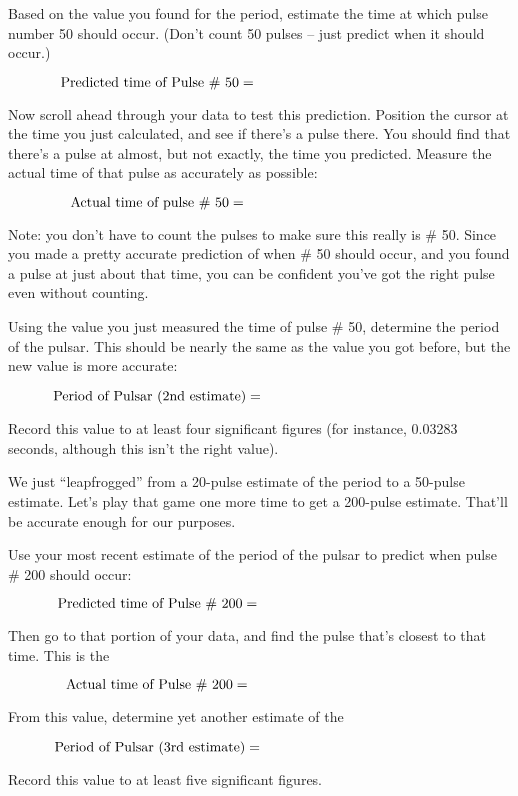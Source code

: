 Based on the value you found for the period, estimate the time at 
which pulse number 50 should occur.  (Don't count 50 pulses -- just
predict when it should occur.)

\medskip
$$
\mbox{Predicted time of Pulse \# 50}=\hbox to 2in{}
$$
\medskip

Now scroll ahead through your data to test this prediction.  Position
the cursor at the time you just calculated, and see if there's a pulse 
there.  You should find that there's a pulse at almost, but not exactly,
the time you predicted.  Measure the actual time of that pulse
as accurately as possible:

\medskip
$$
\mbox{Actual time of pulse \# 50}=\hbox to 2in{}
$$
\medskip

Note: you don't have to count the pulses to make sure this really is
\# 50.  Since you made a pretty accurate prediction of when \# 50
should occur, and you found a pulse at just about that time, you can
be confident you've got the right pulse even without counting.

Using the value you just measured the time of pulse \# 50, determine
the period of the pulsar.  This should be nearly the same as the
value you got before, but the new value is more accurate:

\medskip
$$
\mbox{Period of Pulsar (2nd estimate)}=\hbox to 2in{}
$$
\medskip

Record this value to at least four significant figures (for instance,
0.03283 seconds, although this isn't the right value).

We just ``leapfrogged'' from a 20-pulse estimate of the period to a 
50-pulse estimate.  Let's play that game one more time to get a 200-pulse
estimate.  That'll be accurate enough for our purposes.

Use your most recent estimate of the period of the pulsar to predict
when pulse \# 200 should occur:

\medskip
$$
\mbox{Predicted time of Pulse \# 200}=\hbox to 2in{}
$$
\medskip

Then go to that portion of your data, and find the pulse that's closest
to that time.  This is the

\medskip
$$
\mbox{Actual time of Pulse \# 200}=\hbox to 2in{}
$$
\medskip

From this value, determine yet another estimate of the

\medskip
$$
\mbox{Period of Pulsar (3rd estimate)}=\hbox to 2in{}
$$
\medskip

Record this value to at least five significant figures.

